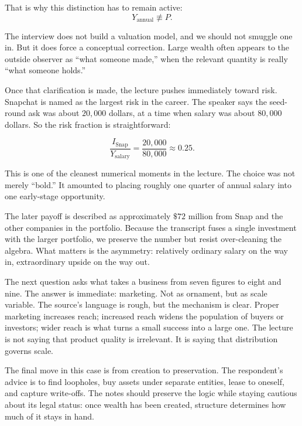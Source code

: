 That is why this distinction has to remain active:
\begin{equation}
Y_{\mathrm{annual}} \not\equiv P.
\end{equation}

The interview does not build a valuation model, and we should not smuggle one in. But it does force a conceptual correction. Large wealth often appears to the outside observer as ``what someone made,'' when the relevant quantity is really ``what someone holds.''

Once that clarification is made, the lecture pushes immediately toward risk. Snapchat is named as the largest risk in the career. The speaker says the seed-round ask was about \(20{,}000\) dollars, at a time when salary was about \(80{,}000\) dollars. So the risk fraction is straightforward:

\begin{equation}
\frac{I_{\mathrm{Snap}}}{Y_{\mathrm{salary}}}
=
\frac{20{,}000}{80{,}000}
\approx 0.25.
\end{equation}

This is one of the cleanest numerical moments in the lecture. The choice was not merely ``bold.'' It amounted to placing roughly one quarter of annual salary into one early-stage opportunity.

The later payoff is described as approximately \(\$72\) million from Snap and the other companies in the portfolio. Because the transcript fuses a single investment with the larger portfolio, we preserve the number but resist over-cleaning the algebra. What matters is the asymmetry: relatively ordinary salary on the way in, extraordinary upside on the way out.

The next question asks what takes a business from seven figures to eight and nine. The answer is immediate: marketing. Not as ornament, but as scale variable. The source's language is rough, but the mechanism is clear. Proper marketing increases reach; increased reach widens the population of buyers or investors; wider reach is what turns a small success into a large one. The lecture is not saying that product quality is irrelevant. It is saying that distribution governs scale.

The final move in this case is from creation to preservation. The respondent's advice is to find loopholes, buy assets under separate entities, lease to oneself, and capture write-offs. The notes should preserve the logic while staying cautious about its legal status: once wealth has been created, structure determines how much of it stays in hand.

